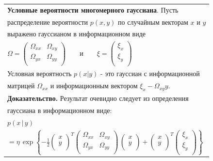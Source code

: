 \documentclass[10pt,a4paper]{article}
\begin{document}
\begin{table}[H]
\begin{center}
\begin{tabular}{|l|}
\hline
\textbf{Условные вероятности многомерного гауссиана}. Пусть\\ распределение вероятности $p(x,y)$ по случайным векторам $x$ и $y$ \\выражено гауссианом в информационном виде\\			
$\varOmega=\left(\begin{array}{cc}\varOmega_{xx}&\varOmega_{xy}\\\varOmega_{yx}&\varOmega_{yy}\\
\end{array} \right)\qquad\text{и}\qquad\xi=\left(\begin{array}{c}\xi_x\\\xi_y\\
\end{array} \right)$\\		Условная вероятность $p(x|y)$ - это гауссиан с информационной\\ матрицей  $\varOmega_{xx}$  и информационным вектором $\xi_x-\varOmega_{xy}y$.\\	
\textbf{Доказательство.} Результат очевидно следует из определения\\ гауссиана в информационном виде:\\
$p(x\,|\,y)$\\
$=\eta\,\exp\left\lbrace -\frac{1}{2}\left(\begin{array}{c}x\\y\\
\end{array} \right)^T\left(\begin{array}{cc}\varOmega_{xx}&\varOmega_{xy}\\\varOmega_{yx}&\varOmega_{yy}\\
\end{array} \right)\,\left(\begin{array}{c}x\\y\\
\end{array} \right)+\left(\begin{array}{c}x\\y\\
\end{array} \right)^T\left(\begin{array}{c}\xi_x\\\xi_y\\
\end{array} \right)\right\rbrace $\\

\end{tabular}
\end{center}
\end{table}
\end{document}
